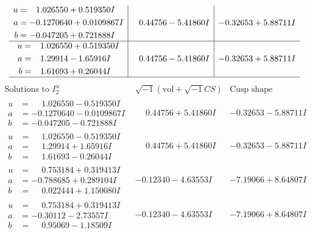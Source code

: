 \documentclass[1p]{elsarticle_modified}
\theoremstyle{definition}
\newcommand{\I}{\sqrt{-1}}
\begin{document}
$$\begin{array}{c|c|c}
\begin{aligned}
u &= \phantom{-}1.026550 + 0.519350 I \\
a &= -0.1270640 + 0.0109867 I \\
b &= -0.047205 + 0.721888 I\end{aligned}
 & \phantom{-}0.44756 - 5.41860 I & -0.32653 + 5.88711 I \\ \hline\begin{aligned}
u &= \phantom{-}1.026550 + 0.519350 I \\
a &= \phantom{-}1.29914 - 1.65916 I \\
b &= \phantom{-}1.61693 + 0.26044 I\end{aligned}
 & \phantom{-}0.44756 - 5.41860 I & -0.32653 + 5.88711 I\\
 \hline 
 \end{array}$$\newpage$$\begin{array}{c|c|c}  
\text{Solutions to }I^u_{2}& \I (\text{vol} + \sqrt{-1}CS) & \text{Cusp shape}\\
 \hline 
\begin{aligned}
u &= \phantom{-}1.026550 - 0.519350 I \\
a &= -0.1270640 - 0.0109867 I \\
b &= -0.047205 - 0.721888 I\end{aligned}
 & \phantom{-}0.44756 + 5.41860 I & -0.32653 - 5.88711 I \\ \hline\begin{aligned}
u &= \phantom{-}1.026550 - 0.519350 I \\
a &= \phantom{-}1.29914 + 1.65916 I \\
b &= \phantom{-}1.61693 - 0.26044 I\end{aligned}
 & \phantom{-}0.44756 + 5.41860 I & -0.32653 - 5.88711 I \\ \hline\begin{aligned}
u &= \phantom{-}0.753184 + 0.319413 I \\
a &= -0.788685 + 0.289104 I \\
b &= \phantom{-}0.022444 + 1.150080 I\end{aligned}
 & -0.12340 - 4.63553 I & -7.19066 + 8.64807 I \\ \hline\begin{aligned}
u &= \phantom{-}0.753184 + 0.319413 I \\
a &= -0.30112 - 2.73557 I \\
b &= \phantom{-}0.95069 - 1.18509 I\end{aligned}
 & -0.12340 - 4.63553 I & -7.19066 + 8.64807 I \\ \hline\begin{aligned}

\end{aligned}
\end{array}$$
\end{document}
